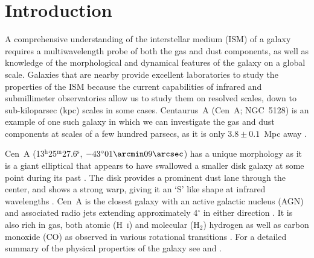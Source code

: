 \documentclass[preprint2]{aastex}
\begin{document}

\section{Introduction}
A comprehensive understanding of the interstellar medium (ISM) of a galaxy requires a multiwavelength probe of both the gas and dust components, as well as knowledge of the morphological and dynamical features of the galaxy on a global scale.  Galaxies that are nearby provide excellent laboratories to study the properties of the ISM because the current capabilities of infrared and submillimeter observatories allow us to study them on resolved scales, down to sub-kiloparsec (kpc) scales in some cases.  Centaurus~A (Cen~A; NGC~5128) is an example of one such galaxy in which we can investigate the gas and dust components at scales of a few hundred parsecs, as it is only $3.8 \pm 0.1$~Mpc away \citep{2010PASA...27..457H}.

Cen~A (13$^{\mathrm{h}}$25$^{\mathrm{m}}$27.6$^{\mathrm{s}}$, $-43^{\circ}01\arcmin09\arcsec$) has a unique morphology as it is a giant elliptical that appears to have swallowed a smaller disk galaxy at some point during its past \citep[e.g. ][]{1980ApJ...241..969T}.  The disk provides a prominent dust lane through the center, and shows a strong warp, giving it an `S' like shape at infrared wavelengths \citep{2002ApJ...565..131L, 2006ApJ...645.1092Q, 2008A&A...490...77W, 2012MNRAS.422.2291P}.  Cen~A is the closest galaxy with an active galactic nucleus (AGN) and associated radio jets extending approximately 4$^{\circ}$ in either direction \citep[e.g.][]{1997A&AS..121...11C, 1998A&ARv...8..237I}.  It is also rich in gas, both atomic (H~\textsc{i}) and molecular (H$_{2}$) hydrogen \citep{2008A&A...485L...5M,2010A&A...515A..67S} as well as carbon monoxide (CO) as observed in various rotational transitions \citep{1987ApJ...322L..73P,1990ApJ...363..451E,1992ApJ...391..121Q,1993A&A...270L..13R, 2012MNRAS.422.2291P}.  For a detailed summary of the physical properties of the galaxy see \citet{1998A&ARv...8..237I} and \citet{2010PASA...27..463M}.
\end{document}
